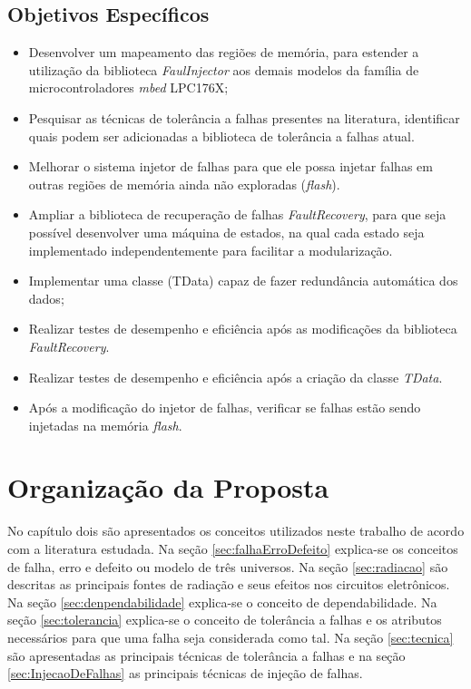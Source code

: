 \subsection{Objetivos Específicos}\label{Sec:ObjetivosEspecificos}
\begin{itemize}
	
	\item  Desenvolver um mapeamento das regiões de memória, para estender a utilização da biblioteca \textit{FaulInjector} aos demais modelos da família de microcontroladores \textit{mbed} LPC176X;
	
	\item Pesquisar as técnicas de tolerância a falhas presentes na literatura, identificar quais podem ser adicionadas a biblioteca de tolerância a falhas atual. 
	
	\item Melhorar o sistema injetor de falhas para que ele possa injetar falhas em outras regiões de memória ainda não exploradas (\textit{flash}).	
	
	\item Ampliar a biblioteca de recuperação de falhas \textit{FaultRecovery}, para que seja possível desenvolver uma máquina de estados, na qual cada estado seja implementado independentemente para facilitar a modularização.
	
	\item Implementar uma classe (TData) capaz de fazer redundância automática dos dados;
	
	\item Realizar testes de desempenho e eficiência após as modificações da biblioteca \textit{FaultRecovery}.
	
	\item Realizar testes de desempenho e eficiência após a criação da classe \textit{TData}.
	
	\item Após a modificação do injetor de falhas, verificar se falhas estão sendo injetadas na memória \textit{flash}. 						
	
\end{itemize}


\newpage

\section{Organização da Proposta} \label{Sec:Organizacao}

No capítulo dois são apresentados os conceitos utilizados neste trabalho de acordo com a literatura estudada. Na seção \ref{sec:falhaErroDefeito} explica-se os conceitos de falha, erro e defeito ou modelo de três universos. Na seção \ref{sec:radiacao} são descritas as principais fontes de radiação e seus efeitos nos circuitos eletrônicos. Na seção \ref{sec:denpendabilidade} explica-se o conceito de dependabilidade. Na seção \ref{sec:tolerancia} explica-se o conceito de tolerância a falhas e os atributos necessários para que uma falha seja considerada como tal. Na seção \ref{sec:tecnica} são apresentadas as principais técnicas de tolerância a falhas e na seção \ref{sec:InjecaoDeFalhas} as principais técnicas de injeção de falhas.

